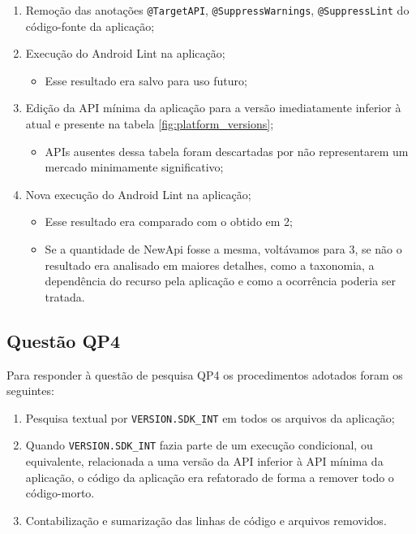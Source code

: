 \begin{enumerate}
	\item Remoção das anotações \texttt{@TargetAPI}, \texttt{@SuppressWarnings},
		 	\texttt{@SuppressLint} do código-fonte da aplicação;
	\item Execução do Android Lint na aplicação;
		\begin{itemize}
			\item Esse resultado era salvo para uso futuro;
		\end{itemize}
	\item Edição da API mínima da aplicação para a versão imediatamente inferior à atual
		e presente na tabela \ref{fig:platform_versions};
		\begin{itemize}
			\item APIs ausentes dessa tabela foram descartadas por não representarem
			um mercado minimamente significativo;
		\end{itemize}
	\item Nova execução do Android Lint na aplicação;
		\begin{itemize}
			\item Esse resultado era comparado com o obtido em 2;
			\item Se a quantidade de NewApi fosse a mesma, voltávamos para 3, se não
			o resultado era analisado em maiores detalhes, como a taxonomia, a dependência
			do recurso pela aplicação e como a ocorrência poderia ser tratada.
		\end{itemize}
\end{enumerate}

\subsection{Questão QP4}
Para responder à questão de pesquisa QP4 os procedimentos adotados foram os seguintes:

\begin{enumerate}
	\item Pesquisa textual por \texttt{VERSION.SDK\_INT} em todos os arquivos da
		aplicação;
	\item Quando \texttt{VERSION.SDK\_INT} fazia parte de um execução condicional, ou equivalente, relacionada a uma versão da API inferior à API mínima da aplicação, o código da aplicação era refatorado de forma a remover todo o código-morto.
	\item Contabilização e sumarização das linhas de código e arquivos removidos.
\end{enumerate}

